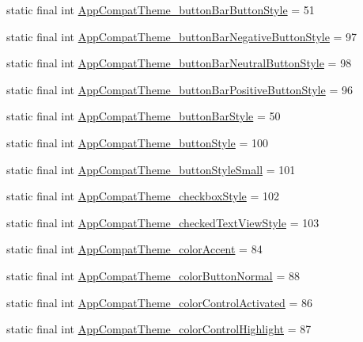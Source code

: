 \begin{DoxyCompactItemize}
\item 
static final int \hyperlink{classproject4_1_1xaria_1_1R_1_1styleable_ae2759e35f58ee9b12ec64393bc516a42}{App\+Compat\+Theme\+\_\+button\+Bar\+Button\+Style} = 51
\item 
static final int \hyperlink{classproject4_1_1xaria_1_1R_1_1styleable_a88fbb3d960b1618f126b09fb5d07f435}{App\+Compat\+Theme\+\_\+button\+Bar\+Negative\+Button\+Style} = 97
\item 
static final int \hyperlink{classproject4_1_1xaria_1_1R_1_1styleable_ad75543e499457698c2fe0f0bd7349a82}{App\+Compat\+Theme\+\_\+button\+Bar\+Neutral\+Button\+Style} = 98
\item 
static final int \hyperlink{classproject4_1_1xaria_1_1R_1_1styleable_a47fda447e64af3bb3b8673d0c9ad9c53}{App\+Compat\+Theme\+\_\+button\+Bar\+Positive\+Button\+Style} = 96
\item 
static final int \hyperlink{classproject4_1_1xaria_1_1R_1_1styleable_ac078eb7b75a54238baace3e740637b7f}{App\+Compat\+Theme\+\_\+button\+Bar\+Style} = 50
\item 
static final int \hyperlink{classproject4_1_1xaria_1_1R_1_1styleable_a3fab352cdcd70d5bb2081408ab0206af}{App\+Compat\+Theme\+\_\+button\+Style} = 100
\item 
static final int \hyperlink{classproject4_1_1xaria_1_1R_1_1styleable_ab6a564eb1b7f2c965484ca489fb8e95c}{App\+Compat\+Theme\+\_\+button\+Style\+Small} = 101
\item 
static final int \hyperlink{classproject4_1_1xaria_1_1R_1_1styleable_afad6cf2b0ee135e8a4df052b6eb4d916}{App\+Compat\+Theme\+\_\+checkbox\+Style} = 102
\item 
static final int \hyperlink{classproject4_1_1xaria_1_1R_1_1styleable_a22209fcca0bd05c9f68f33c77180738e}{App\+Compat\+Theme\+\_\+checked\+Text\+View\+Style} = 103
\item 
static final int \hyperlink{classproject4_1_1xaria_1_1R_1_1styleable_a6e46aba539289d70ed3d16e8e7bcb018}{App\+Compat\+Theme\+\_\+color\+Accent} = 84
\item 
static final int \hyperlink{classproject4_1_1xaria_1_1R_1_1styleable_a84437157df751a100d61fc0f2d910f0b}{App\+Compat\+Theme\+\_\+color\+Button\+Normal} = 88
\item 
static final int \hyperlink{classproject4_1_1xaria_1_1R_1_1styleable_ade53ff10ccbf446032b640b82cfcd1d8}{App\+Compat\+Theme\+\_\+color\+Control\+Activated} = 86
\item 
static final int \hyperlink{classproject4_1_1xaria_1_1R_1_1styleable_a9951a735820466ee03e784ca50e2c4f4}{App\+Compat\+Theme\+\_\+color\+Control\+Highlight} = 87

\end{DoxyCompactItemize}
